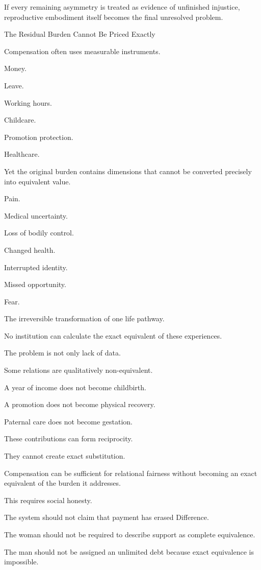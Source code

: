 If every remaining asymmetry is treated as evidence of unfinished injustice, reproductive embodiment itself becomes the final unresolved problem.

The Residual Burden Cannot Be Priced Exactly

Compensation often uses measurable instruments.

Money.

Leave.

Working hours.

Childcare.

Promotion protection.

Healthcare.

Yet the original burden contains dimensions that cannot be converted precisely into equivalent value.

Pain.

Medical uncertainty.

Loss of bodily control.

Changed health.

Interrupted identity.

Missed opportunity.

Fear.

The irreversible transformation of one life pathway.

No institution can calculate the exact equivalent of these experiences.

The problem is not only lack of data.

Some relations are qualitatively non-equivalent.

A year of income does not become childbirth.

A promotion does not become physical recovery.

Paternal care does not become gestation.

These contributions can form reciprocity.

They cannot create exact substitution.

Compensation can be sufficient for relational fairness without becoming an exact equivalent of the burden it addresses.

This requires social honesty.

The system should not claim that payment has erased Difference.

The woman should not be required to describe support as complete equivalence.

The man should not be assigned an unlimited debt because exact equivalence is impossible.

